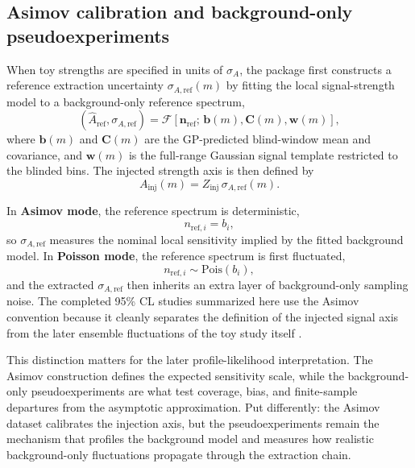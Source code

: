 \subsection{Asimov calibration and background-only pseudoexperiments}

When toy strengths are specified in units of $\sigma_A$, the package first constructs a
reference extraction uncertainty $\sigma_{A,\mathrm{ref}}(m)$ by fitting the local
signal-strength model to a background-only reference spectrum,
\begin{equation}
\left(\hat A_{\mathrm{ref}},\sigma_{A,\mathrm{ref}}\right)
=
\mathcal{F}\!\left[\bm{n}_{\mathrm{ref}};\,\bm{b}(m),\bm{C}(m),\bm{w}(m)\right],
\end{equation}
where $\bm{b}(m)$ and $\bm{C}(m)$ are the GP-predicted blind-window mean and covariance,
and $\bm{w}(m)$ is the full-range Gaussian signal template restricted to the blinded
bins. The injected strength axis is then defined by
\begin{equation}
A_{\mathrm{inj}}(m) = Z_{\mathrm{inj}}\,\sigma_{A,\mathrm{ref}}(m).
\end{equation}

In \textbf{Asimov mode}, the reference spectrum is deterministic,
\begin{equation}
n_{\mathrm{ref},i} = b_i,
\end{equation}
so $\sigma_{A,\mathrm{ref}}$ measures the nominal local sensitivity implied by the
fitted background model. In \textbf{Poisson mode}, the reference spectrum is first
fluctuated,
\begin{equation}
n_{\mathrm{ref},i} \sim \mathrm{Pois}\!\left(b_i\right),
\end{equation}
and the extracted $\sigma_{A,\mathrm{ref}}$ then inherits an extra layer of
background-only sampling noise. The completed 95\% CL studies summarized here use the
Asimov convention because it cleanly separates the definition of the injected signal
axis from the later ensemble fluctuations of the toy study itself
\cite{Cowan1998,Cowan2011}.

This distinction matters for the later profile-likelihood interpretation. The Asimov
construction defines the expected sensitivity scale, while the background-only
pseudoexperiments are what test coverage, bias, and finite-sample departures from the
asymptotic approximation. Put differently: the Asimov dataset calibrates the injection
axis, but the pseudoexperiments remain the mechanism that profiles the background model
and measures how realistic background-only fluctuations propagate through the
extraction chain.


